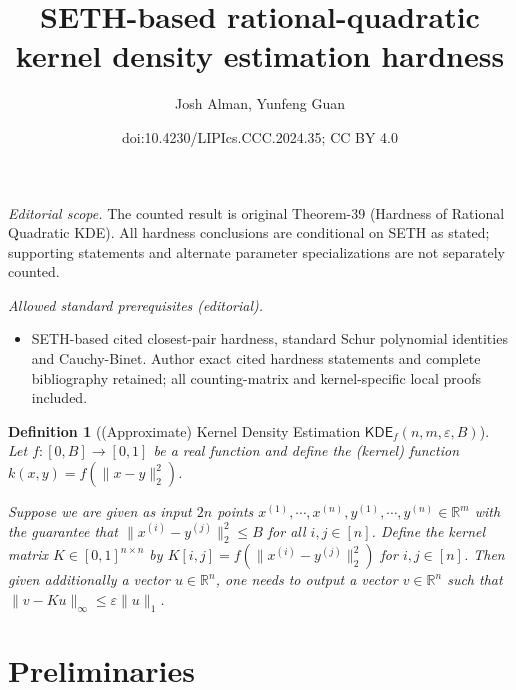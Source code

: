 \documentclass[10pt,a4paper]{article}
\title{SETH-based rational-quadratic kernel density estimation hardness}
\author{Josh Alman, Yunfeng Guan}
\date{doi:10.4230/LIPIcs.CCC.2024.35; CC BY 4.0}
\newtheorem{definition}[theorem]{Definition}
\theoremstyle{remark}
\numberwithin{equation}{section}
\numberwithin{theorem}{section}
\newcommand{\R}{\ensuremath{\mathbb{R}}}
\newcommand{\eps}{\varepsilon}
\begin{document}
\maketitle
\setcounter{section}{1}
\noindent\textit{Editorial scope.} The counted result is original Theorem-39 (Hardness of Rational Quadratic KDE). All hardness conclusions are conditional on SETH as stated; supporting statements and alternate parameter specializations are not separately counted.\par\medskip
\noindent\textit{Allowed standard prerequisites (editorial).}\begin{itemize}
\item SETH-based cited closest-pair hardness, standard Schur polynomial identities and Cauchy-Binet. Author exact cited hardness statements and complete bibliography retained; all counting-matrix and kernel-specific local proofs included.
\end{itemize}\medskip
\begin{definition}[(Approximate) Kernel Density Estimation $\mathsf{KDE}_f(n, m, \eps, B)$]
Let $f: [0, B] \rightarrow [0, 1]$ be a real function and define the (kernel) function $k(x, y) = f(\|x-y\|_2^2)$.

Suppose we are given as input $2n$ points $x^{(1)}, \cdots, x^{(n)}, y^{(1)}, \cdots, y^{(n)} \in \R^m$ with the guarantee that $\|x^{(i)} - y^{(j)}\|_2^2 \le B$ for all $i, j \in [n]$.
Define the kernel matrix $K \in [0,1]^{n \times n}$ by $K[i, j] = f(\|x^{(i)}- y^{(j)}\|_2^2)$ for $i, j \in [n]$.
Then given additionally a vector $u \in \R^n$, one needs to output a vector $v \in \R^n$ such that
$\|v - K u\|_{\infty} \le \eps\|u\|_{1}$.
\end{definition}

\section{Preliminaries}
\end{document}
